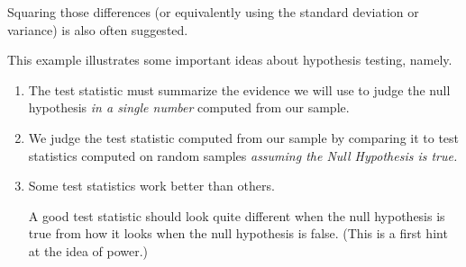 Squaring those differences (or equivalently using the standard deviation or variance)
is also often suggested.

\begin{center}
\begin{knitrout}
\end{knitrout}

\end{center}

This example illustrates some important ideas about hypothesis testing, namely.
%

\begin{boxedText}
\begin{enumerate}
\item The test statistic must summarize the evidence we will use to 
judge the null hypothesis \emph{in a single number} computed from our sample.
\item
We judge the test statistic computed from our sample by comparing it to
test statistics computed on random samples \emph{assuming the Null Hypothesis is true.}
\item
Some test statistics work better than others.

A good test statistic should look quite different when the null hypothesis 
is true from how it looks when the null hypothesis is false.  
(This is a first hint at the idea of power.)
\end{enumerate}
\end{boxedText}

